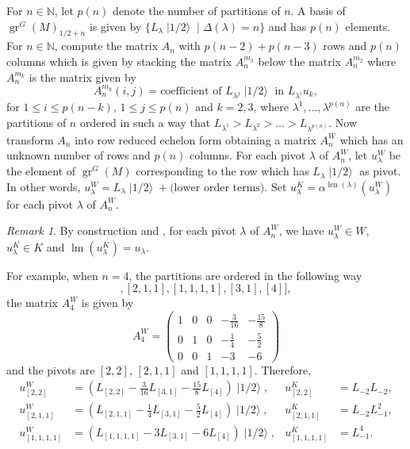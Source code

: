 \documentclass[a4paper, 12pt, reqno]{amsart}
\theoremstyle{remark}
\newtheorem{remark}[theorem]{Remark}
\DeclareMathOperator{\gr}{gr}
\DeclareMathOperator{\lm}{lm}
\DeclareMathOperator{\len}{len}
\DeclareMathOperator{\vachalf}{|1/2\rangle}
\begin{document}
For $n \in \mathbb{N}$, let $p(n)$ denote the number of partitions of $n$.
A basis of $\gr^G(M)_{1/2 + n}$ is given by $\{L_{\lambda}\vachalf \mid \Delta(\lambda) = n\}$ and has $p(n)$ elements.
For $n \in \mathbb{N}$, compute the matrix $A_n$ with $p(n - 2) + p(n - 3)$ rows and $p(n)$ columns which is given by stacking the matrix $A^{m_3}_n$ below the matrix $A^{m_2}_n$ where $A^{m_k}_n$ is the matrix given by
\begin{equation*}
  A^{m_k}_n(i, j) = \text{coefficient of }L_{\lambda^j}\vachalf\text{ in }L_{\lambda^i}u_k,
\end{equation*}
for $1 \le i \le p(n - k)$, $1 \le j \le p(n)$ and $k = 2, 3$, where $\lambda^1, \dots, \lambda^{p(n)}$ are the partitions of $n$ ordered in such a way that $L_{\lambda^1} > L_{\lambda^2} > \dots > L_{\lambda^{p(n)}}$.
Now transform $A_n$ into row reduced echelon form obtaining a matrix $A^W_n$ which has an unknown number of rows and $p(n)$ columns.
For each pivot $\lambda$ of $A^W_n$, let $u^W_{\lambda}$ be the element of $\gr^G(M)$ corresponding to the row which has $L_{\lambda}\vachalf$ as pivot.
In other words, $u^W_{\lambda} = L_{\lambda}\vachalf + \text{(lower order terms)}$.
Set $u^K_{\lambda} = \alpha^{\len(\lambda)}(u^W_{\lambda})$ for each pivot $\lambda$ of $A^W_n$.

\begin{remark}
  \label{rmk:4}
  By construction and , for each pivot $\lambda$ of $A^W_n$, we have $u^W_{\lambda} \in W$, $u^K_{\lambda} \in K$ and $\lm(u^K_{\lambda}) = u_{\lambda}$.
\end{remark}

For example, when $n = 4$, the partitions are ordered in the following way
\begin{equation*}
  [[2, 2], [2, 1, 1], [1, 1, 1, 1], [3, 1], [4]],
\end{equation*}
the matrix $A^W_4$ is given by
\begin{equation*}
  A^W_4=
  \begin{pmatrix}
    1 & 0 & 0 & -\frac{3}{16} & -\frac{15}{8} \\
    0 & 1 & 0 & -\frac{1}{4} & -\frac{5}{2} \\
    0 & 0 & 1 & -3 & -6
  \end{pmatrix}
\end{equation*}
and the pivots are $[2, 2]$, $[2, 1, 1]$ and $[1, 1, 1, 1]$.
Therefore,
\begin{align*}
  u^W_{[2, 2]} &= (L_{[2, 2]} - \tfrac{3}{16}L_{[3, 1]} - \tfrac{15}{8}L_{[4]})\vachalf, &u^K_{[2, 2]} &= L_{-2}L_{-2}, \\
  u^W_{[2, 1, 1]} &= (L_{[2, 1, 1]} - \tfrac{1}{4}L_{[3, 1]} - \tfrac{5}{2}L_{[4]})\vachalf, &u^K_{[2, 1, 1]} &= L_{-2}L_{-1}^2, \\
  u^W_{[1, 1, 1, 1]} &= (L_{[1, 1, 1, 1]} - 3L_{[3, 1]} - 6L_{[4]})\vachalf, &u^K_{[1, 1, 1, 1]} &= L_{-1}^4.
\end{align*}
\end{document}
